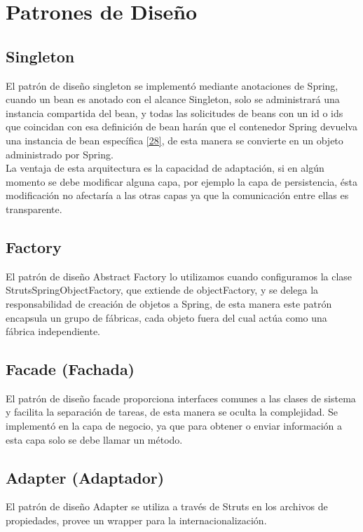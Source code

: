 \section{Patrones de Diseño}

\subsection{Singleton}
El patrón de diseño singleton se implementó mediante anotaciones de Spring, cuando un bean es anotado con el alcance Singleton, solo se administrará una instancia compartida del bean, y todas las solicitudes de beans con un id o ids que coincidan con esa definición de bean harán que el contenedor Spring devuelva una instancia de bean específica \hyperlink{b28}{[28]}, de esta manera se convierte en un objeto administrado por Spring.\\

La ventaja de esta arquitectura es la capacidad de adaptación, si en algún momento se debe modificar alguna capa, por ejemplo la capa de persistencia, ésta modificación no afectaría a las otras capas ya que la comunicación entre ellas es transparente.

\subsection{Factory}
El patrón de diseño Abstract Factory lo utilizamos cuando configuramos la clase StrutsSpringObjectFactory, que extiende de objectFactory, y se delega la responsabilidad de creación de objetos a Spring, de esta manera este patrón encapsula un grupo de fábricas, cada objeto fuera del cual actúa como una fábrica independiente.

\subsection{Facade (Fachada)}
El patrón de diseño facade proporciona interfaces comunes a las clases de sistema y facilita la separación de tareas, de esta manera se oculta la complejidad. Se implementó en la capa de negocio, ya que para obtener o enviar información a esta capa solo se debe llamar un método. 

\subsection{Adapter (Adaptador)}
El patrón de diseño Adapter se utiliza a través de Struts en los archivos de propiedades, provee un wrapper para la internacionalización.

